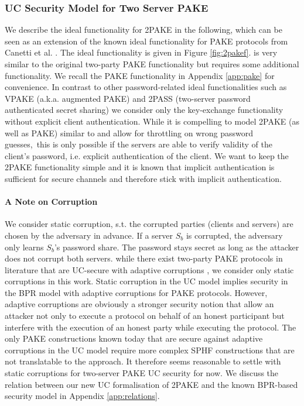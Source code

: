 \subsubsection{UC Security Model for Two Server PAKE}\label{sec:2pakesecurity}
We describe the ideal functionality for 2PAKE in the following, which can be seen as an extension of the known ideal functionality for PAKE protocols from Canetti et al. \cite{Canetti2005}.
The ideal functionality \FTWOPAKE is given in Figure \ref{fig:2pakef}.
\FTWOPAKE is very similar to the original two-party PAKE functionality but requires some additional functionality.
We recall the PAKE functionality in Appendix \ref{app:pake} for convenience.
In contrast to other password-related ideal functionalities such as VPAKE \cite{Gentry2006} (a.k.a. augmented PAKE) and 2PASS \cite{Camenisch_Lysyanskaya_Neven_2012} (two-server password authenticated secret sharing) we consider only the key-exchange functionality without explicit client authentication.
While it is compelling to model 2PAKE (as well as PAKE) similar to \cite{Camenisch_Lysyanskaya_Neven_2012} and allow for throttling on wrong password guesses,\footnotemark\ this is only possible if the servers are able to verify validity of the client's password, i.e. explicit authentication of the client.
We want to keep the 2PAKE functionality simple and it is known that implicit authentication is sufficient for secure channels \cite{CanettiK01} and therefore stick with implicit authentication.


\paragraph{A Note on Corruption}
We consider static corruption, s.t. the corrupted parties (clients and servers) are chosen by the adversary in advance.
If a server $S_b$ is corrupted, the adversary only learns $S_b$'s password share. 
The password stays secret as long as the attacker does not corrupt both servers.
while there exist two-party PAKE protocols in literature that are UC-secure with adaptive corruptions \cite{AbdallaBBCP13,AbdallaBP14a,AbdallaCCP09,AbdallaCP09}, we consider only static corruptions in this work.
Static corruption in the UC model implies security in the BPR model with adaptive corruptions \cite{Canetti2005} for PAKE protocols.
However, adaptive corruptions are obviously a stronger security notion that allow an attacker not only to execute a protocol on behalf of an honest participant but interfere with the execution of an honest party while executing the protocol.
The only PAKE constructions known today that are secure against adaptive corruptions in the UC model require more complex SPHF constructions that are not translatable to the \DSPHF approach.
It therefore seems reasonable to settle with static corruptions for two-server PAKE UC security for now.
We discuss the relation between our new UC formalisation of 2PAKE and the known BPR-based security model in Appendix \ref{app:relations}.


